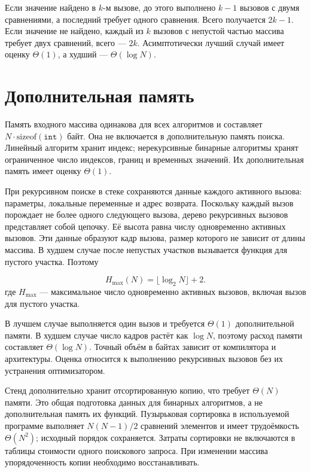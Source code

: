 Если значение найдено в $k$-м вызове, до этого выполнено $k-1$ вызовов с двумя сравнениями, а последний требует одного сравнения. Всего получается $2k-1$. Если значение не найдено, каждый из $k$ вызовов с непустой частью массива требует двух сравнений, всего --- $2k$. Асимптотически лучший случай имеет оценку $\Theta(1)$, а худший --- $\Theta(\log N)$.

\section{Дополнительная память}
Память входного массива одинакова для всех алгоритмов и составляет $N\cdot\mathrm{sizeof}(\texttt{int})$ байт. Она не включается в дополнительную память поиска. Линейный алгоритм хранит индекс; нерекурсивные бинарные алгоритмы хранят ограниченное число индексов, границ и временных значений. Их дополнительная память имеет оценку $\Theta(1)$.

При рекурсивном поиске в стеке сохраняются данные каждого активного вызова: параметры, локальные переменные и адрес возврата. Поскольку каждый вызов порождает не более одного следующего вызова, дерево рекурсивных вызовов представляет собой цепочку. Её высота равна числу одновременно активных вызовов. Эти данные образуют кадр вызова, размер которого не зависит от длины массива. В худшем случае после непустых участков вызывается функция для пустого участка. Поэтому
\begin{samepage}
\begin{equation}\label{eq:memory}
 H_{\max}(N)=\lfloor\log_2N\rfloor+2.
\end{equation}
\indent где $H_{\max}$ --- максимальное число одновременно активных вызовов, включая вызов для пустого участка.
\end{samepage}

В лучшем случае выполняется один вызов и требуется $\Theta(1)$ дополнительной памяти. В худшем случае число кадров растёт как $\log N$, поэтому расход памяти составляет $\Theta(\log N)$. Точный объём в байтах зависит от компилятора и архитектуры. Оценка относится к выполнению рекурсивных вызовов без их устранения оптимизатором.

Стенд дополнительно хранит отсортированную копию, что требует $\Theta(N)$ памяти. Это общая подготовка данных для бинарных алгоритмов, а не дополнительная память их функций. Пузырьковая сортировка в используемой программе выполняет $N(N-1)/2$ сравнений элементов и имеет трудоёмкость $\Theta(N^2)$; исходный порядок сохраняется. Затраты сортировки не включаются в таблицы стоимости одного поискового запроса. При изменении массива упорядоченность копии необходимо восстанавливать.

